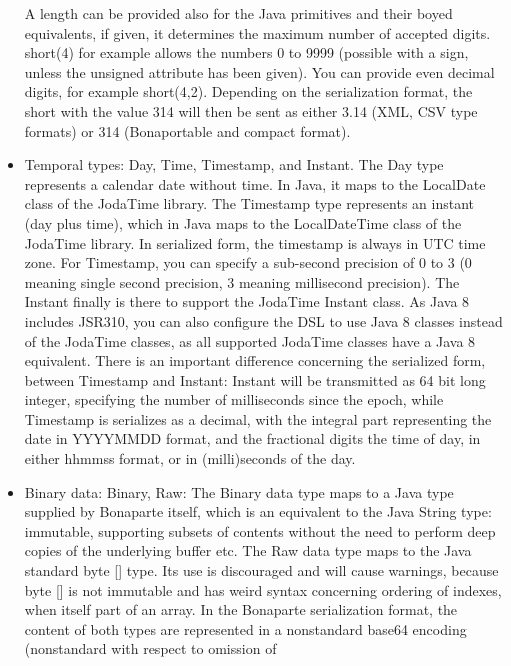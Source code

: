 \documentclass[11pt,a4paper,oneside]{article}
\begin{document}
\begin{itemize}
      A length can be provided also for the Java primitives and their boyed equivalents, if given, it determines the maximum
      number of accepted digits. {\ttfamily short(4)} for example allows the numbers 0 to 9999 (possible with a sign, unless
      the {\ttfamily unsigned} attribute has been given). You can provide even decimal digits, for example {\ttfamily
      short(4,2)}. Depending on the serialization format, the short with the value 314 will then be sent as either 3.14 (XML,
      CSV type formats) or 314 (Bonaportable and compact format).
  \item Temporal types: {\ttfamily Day}, {\ttfamily Time}, {\ttfamily Timestamp}, and {\ttfamily Instant}. The {\ttfamily Day}
  type represents a calendar date without time. In Java, it maps to the {\ttfamily LocalDate} class of the JodaTime library. The {\ttfamily Timestamp} type represents an instant (day plus time), which in Java maps
    to the {\ttfamily LocalDateTime} class of the JodaTime library. In serialized form, the timestamp is always in UTC time zone. For {\ttfamily Timestamp},
    you can specify a sub-second precision of 0 to 3 (0 meaning single second precision, 3 meaning millisecond precision).
    The {\ttfamily Instant} finally is there to support the JodaTime {\ttfamily Instant} class.
    As Java 8 includes JSR310, you can also configure the DSL to use Java 8 classes instead of the JodaTime classes, as all
    supported JodaTime classes have a Java 8 equivalent. There is an important difference concerning the serialized form,
    between {\ttfamily Timestamp} and {\ttfamily Instant}: {\ttfamily Instant} will be transmitted as 64 bit long integer,
    specifying the number of milliseconds since the epoch, while {\ttfamily Timestamp} is serializes as a decimal, with the
    integral part representing the date in YYYYMMDD format, and the fractional digits the time of day, in either hhmmss
    format, or in (milli)seconds of the day.
  \item Binary data: {\ttfamily Binary}, {\ttfamily Raw}: The {\ttfamily Binary} data type maps to a Java type supplied by Bonaparte itself, which is an
    equivalent to the Java {\ttfamily String} type: immutable, supporting subsets of contents without the need to perform deep copies of the underlying buffer etc.
    The {\ttfamily Raw} data type maps to the Java standard {\ttfamily byte []} type. Its use is discouraged and will cause warnings, because
    {\ttfamily byte []} is not immutable and has weird syntax concerning ordering of indexes, when itself part of an array.
    In the Bonaparte serialization format, the content of both types are represented in a nonstandard base64 encoding (nonstandard with respect to omission of

\end{itemize}
\end{document}
